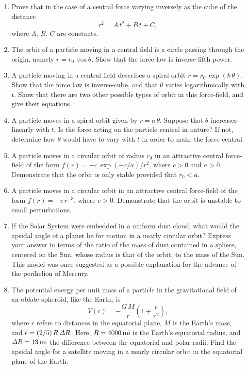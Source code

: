 {\begin{enumerate}
Show that the time interval that the comet remains inside the Earth's orbit is the
faction
$$
\frac{2^{1/2}}{3\,\pi}\left(\frac{2\,p}{a}+1\right)\left(1-\frac{p}{a}\right)^{1/2}
$$
of a year, and that the maximum value of this time interval is $2/3\pi$ year, or
about 11 weeks.
\item Prove that in the case of a central force varying inversely as the cube of the
distance
$$
r^2 = A\,t^2+B\,t+C,
$$
where $A$, $B$, $C$ are constants.
\item The orbit of a particle moving in a central field is a circle passing
through the origin, namely $r=r_0\,\cos\theta$. Show that the force law
is inverse-fifth power.
\item A particle moving in a central field describes a spiral orbit $r=r_0\,\exp(k\,\theta)$.
Show that the force law is inverse-cube, and that $\theta$ varies logarithmically with $t$.
Show that there are two other possible types of orbit in this force-field, and give their
equations.
\item A particle moves in a spiral orbit given by $r=a\,\theta$. Suppose that $\theta$ increases linearly
with $t$. Is the force acting on the particle central in nature? If not, determine how $\theta$ would have to
vary with $t$ in order to make the force  central.
\item A particle moves in a circular orbit of radius $r_0$ in an attractive
central force-field of the form $f(r) = -c\,\exp(-r/a)/r^2$, where $c>0$ and $a>0$.
Demonstrate that the orbit is only stable provided that $r_0<a$.
\item A particle moves in a circular orbit in an attractive
central force-field of the form $f(r) = -c\,r^{-3}$, where $c>0$. Demonstrate
that the orbit is unstable to small perturbations.
\item If the Solar System were embedded in a uniform dust cloud, what would the apsidal angle
of a planet be for motion in a nearly circular orbit? Express your answer in terms of the ratio of the mass of dust contained in a sphere, centered on the Sun, whose radius is that of the orbit, to the mass of the Sun.
This model was once suggested as a possible
explanation for the advance of the perihelion of Mercury. 

\item The potential energy per unit mass of a particle in the gravitational
field of an oblate spheroid, like the Earth, is
$$
V(r) = - \frac{G\,M}{r}\left(1+\frac{\epsilon}{r^2}\right),
$$
where $r$ refers to distances in the equatorial plane, $M$ is the Earth's mass, and
$\epsilon= (2/5)\,R\,{\mit\Delta}R$. Here, $R=4000\,{\rm mi}$ is the Earth's equatorial radius, and ${\mit\Delta}R = 13\,{\rm mi}$ the difference between the equatorial and polar radii.
Find the apsidal angle for a satellite moving in a nearly circular orbit in the equatorial
plane of the Earth.
\end{enumerate}

}